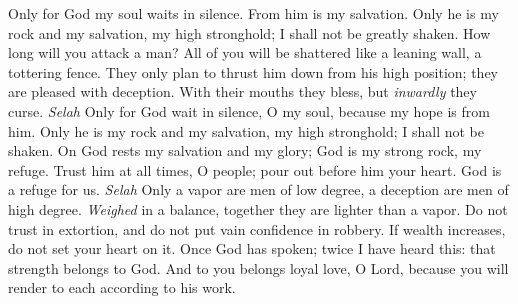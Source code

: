 \begin{biblechapter} %
 Only for God my soul waits in silence. 
From him is my salvation.
\verse Only he is my rock and my salvation, 
my high stronghold; I shall not be greatly shaken.
\verse How long will you attack a man? 
All of you will be shattered 
like a leaning wall, a tottering fence.
\verse They only plan to thrust him down from his high position; 
they are pleased with deception. 
With their mouths they bless, 
but \textit{inwardly} they curse. \textit{Selah}
\verse Only for God wait in silence, O my soul, 
because my hope is from him.
\verse Only he is my rock and my salvation, 
my high stronghold; I shall not be shaken.
\verse On God rests my salvation and my glory; 
God is my strong rock, my refuge.
\verse Trust him at all times, O people; 
pour out before him your heart. 
God is a refuge for us. \textit{Selah}
\verse Only a vapor are men of low degree, 
a deception are men of high degree. 
\textit{Weighed} in a balance, 
together they are lighter than a vapor.
\verse Do not trust in extortion, 
and do not put vain confidence in robbery. 
If wealth increases, 
do not set your heart on it.
\verse Once God has spoken; 
twice I have heard this: 
that strength belongs to God.
\verse And to you belongs loyal love, O Lord, 
because you will render to each according to his work.
\end{biblechapter}

